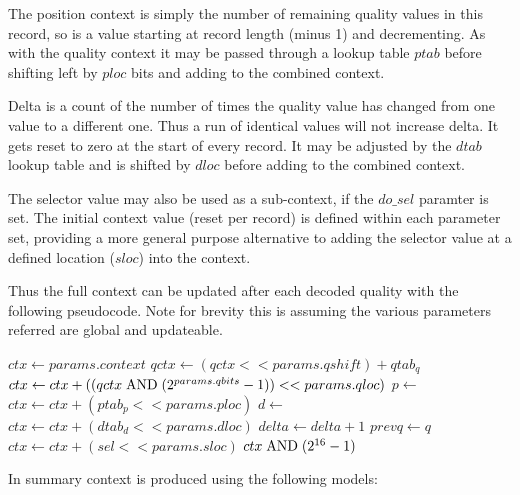 \documentclass[a4paper]{article}
\begin{document}
The position context is simply the number of remaining quality values
in this record, so is a value starting at record length (minus 1) and
decrementing.  As with the quality context it may be passed through a
lookup table $ptab$ before shifting left by $ploc$ bits and adding to
the combined context.

Delta is a count of the number of times the quality value has changed
from one value to a different one.  Thus a run of identical values
will not increase delta.  It gets reset to zero at the start of every
record.  It may be adjusted by the $dtab$ lookup table and is shifted
by $dloc$ before adding to the combined context.

The selector value may also be used as a sub-context, if the $do\_sel$
paramter is set.  The initial context value (reset per record) is
defined within each parameter set, providing a more general purpose
alternative to adding the selector value at a defined location
($sloc$) into the context.

Thus the full context can be updated after each decoded quality with
the following pseudocode.  Note for brevity this is assuming the
various parameters referred are global and updateable.

\begin{algorithmic}[1]
  \State $ctx \gets params.context$ 
  \State $qctx \gets (qctx << params.qshift) + qtab_q$
  \State $ctx   \gets ctx + ((qctx \bitand (2^{params.qbits}-1)) << params.qloc)$
   
    \State $p \gets $
    \State $ctx \gets ctx + (ptab_p << params.ploc)$
  \EndIf
   
    \State $d \gets $
    \State $ctx \gets ctx + (dtab_d << params.dloc)$
      \State $delta \gets delta+1$
    \EndIf
    \State $prevq \gets q$
  \EndIf
   
    \State $ctx \gets ctx + (sel << params.sloc)$
  \EndIf
  \State \Return $ctx\bitand (2^{16}-1)$
\EndFunction
\end{algorithmic}

In summary context is produced using the following models:
\end{document}
